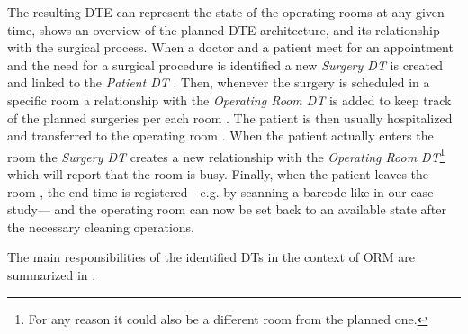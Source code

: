 The resulting \ac{DTE} can represent the state of the operating rooms at any given time,  shows an overview of the planned \ac{DTE} architecture, and its relationship with the surgical process.
%
When a doctor and a patient meet for an appointment and the need for a surgical procedure is identified  a new \textit{Surgery DT} is created  and linked to the \emph{Patient DT} . 
%
Then, whenever the surgery is scheduled in a specific room  a relationship with the \emph{Operating Room DT} is added to keep track of the planned surgeries per each room .
%
The patient is then usually hospitalized and transferred to the operating room . When the patient actually enters the room the \textit{Surgery DT} creates a new relationship with the \emph{Operating Room DT}\footnote{For any reason it could also be a different room from the planned one.}  which will report that the room is busy.
%
Finally, when the patient leaves the room , the end time is registered---e.g. by scanning a barcode like in our case study--- and the operating room can now be set back to an available state after the necessary cleaning operations.


The main responsibilities of the identified \acp{DT} in the context of ORM are summarized in .

